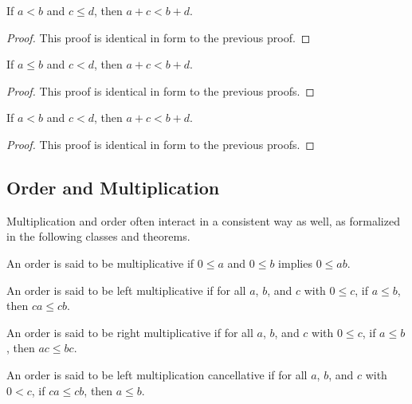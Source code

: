\documentclass[../../math.tex]{subfiles}
\begin{document}
\begin{theorem} \label{lt_le_lrplus}
    If $a < b$ and $c \leq d$, then $a + c < b + d$.
\end{theorem}
\begin{proof}
    This proof is identical in form to the previous proof.
\end{proof}

\begin{theorem} \label{le_lt_lrplus}
    If $a \leq b$ and $c < d$, then $a + c < b + d$.
\end{theorem}
\begin{proof}
    This proof is identical in form to the previous proofs.
\end{proof}

\begin{theorem} \label{lt_lrplus}
    If $a < b$ and $c < d$, then $a + c < b + d$.
\end{theorem}
\begin{proof}
    This proof is identical in form to the previous proofs.
\end{proof}

\subsection{Order and Multiplication}

Multiplication and order often interact in a consistent way as well, as
formalized in the following classes and theorems.

\begin{class}
    An order is said to be multiplicative if $0 \leq a$ and $0 \leq b$ implies
    $0 \leq ab$.
\end{class}

\begin{class}
    An order is said to be left multiplicative if for all $a$, $b$, and $c$ with
    $0 \leq c$, if $a \leq b$, then $ca \leq cb$.
\end{class}

\begin{class}
    An order is said to be right multiplicative if for all $a$, $b$, and $c$
    with $0 \leq c$, if $a \leq b$, then $ac \leq bc$.
\end{class}

\begin{class}
    An order is said to be left multiplication cancellative if for all $a$, $b$,
    and $c$ with $0 < c$, if $ca \leq cb$, then $a \leq b$.
\end{class}
\end{document}
